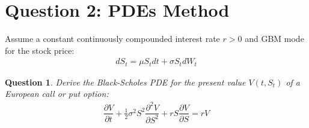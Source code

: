 \documentclass[16pt]{article}
\newtheorem{qu}{Question}[section]
\begin{document}
	\section{Question 2: PDEs Method}
	Assume a constant continuously compounded interest rate
	$r > 0$ and GBM mode for the stock price:
	\begin{align}
		d S_{t} = \mu S_{t} d t  +  \sigma S_{t} d W_{t}
	\end{align}

	\begin{qu}
		Derive the Black-Scholes PDE for the present value $V(t, S_{t})$ of a European call or put option:
		\begin{align}
			\dfrac{\partial V}{\partial t} + \frac{1}{2} \sigma^2 S^2 \dfrac{\partial^2 V}{\partial S^2} + rS \dfrac{\partial V}{\partial S} = rV
		\end{align}
	\end{qu}
	
\end{document}
